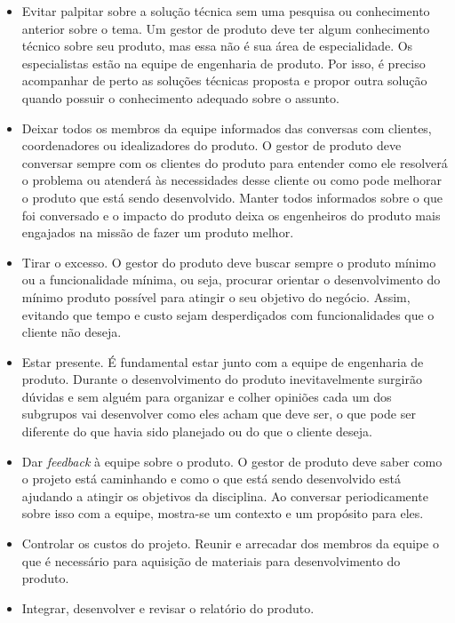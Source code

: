 \begin{itemize}
\item Evitar palpitar sobre a solução técnica sem uma pesquisa ou conhecimento anterior sobre o tema. Um gestor de produto deve ter algum conhecimento técnico sobre seu produto, mas essa não é sua área de especialidade. Os especialistas estão na equipe de engenharia de produto. Por isso, é preciso acompanhar de perto as soluções técnicas proposta e propor outra solução quando possuir o conhecimento adequado sobre o assunto.
\item Deixar todos os membros da equipe informados das conversas com clientes, coordenadores ou idealizadores do produto. O gestor de produto deve conversar sempre com os clientes do produto para entender como ele resolverá o problema ou atenderá às necessidades desse cliente ou como pode melhorar o produto que está sendo desenvolvido. Manter todos informados sobre o que foi conversado e o impacto do produto deixa os engenheiros do produto mais engajados na missão de fazer um produto melhor.
\item Tirar o excesso. O gestor do produto deve buscar sempre o produto mínimo ou a funcionalidade mínima, ou seja, procurar orientar o desenvolvimento do mínimo produto possível para atingir o seu objetivo do negócio. Assim, evitando que tempo e custo sejam desperdiçados com funcionalidades que o cliente não deseja. 
\item Estar presente. É fundamental estar junto com a equipe de engenharia de produto. Durante o desenvolvimento do produto inevitavelmente surgirão dúvidas e sem alguém para organizar e colher opiniões cada um dos subgrupos vai desenvolver como eles acham que deve ser, o que pode ser diferente do que havia sido planejado ou do que o cliente deseja.
\item Dar \textit{feedback} à equipe sobre o produto. O gestor de produto deve saber como o projeto está caminhando e como o que está sendo desenvolvido está ajudando a atingir os objetivos da disciplina. Ao conversar periodicamente sobre isso com a equipe, mostra-se um contexto e um propósito para eles. 
\item Controlar os custos do projeto. Reunir e arrecadar dos membros da equipe o que é necessário para aquisição de materiais para desenvolvimento do produto.
\item Integrar, desenvolver e revisar o relatório do produto.
\end{itemize}
